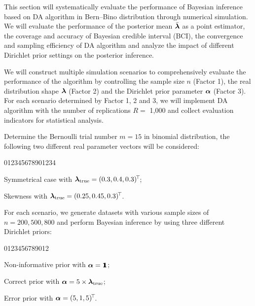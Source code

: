 This section will systematically evaluate the performance of Bayesian inference based on DA algorithm in Bern--Bino distribution through numerical simulation. We will evaluate the performance of the posterior mean $\bar{{\boldsymbol{\lambda}}}$ as a point estimator, the coverage and accuracy of Bayesian credible interval (BCI), the convergence and sampling efficiency of DA algorithm and analyze the impact of different Dirichlet prior settings on the posterior inference.

We will construct multiple simulation scenarios to comprehensively evaluate the performance of the algorithm by controlling the sample size $n$ (Factor 1), the real distribution shape ${\boldsymbol{\lambda}}$ (Factor 2) and the Dirichlet prior parameter ${\boldsymbol{\alpha}}$ (Factor 3). For each scenario determined by Factor 1, 2 and 3, we will implement DA algorithm with the number of replications $R=$ 1,000 and collect evaluation indicators for statistical analysis.

Determine the Bernoulli trial number $m=15$ in binomial distribution, the following two different real parameter vectors will be considered:
\begin{namelist}{012345678901234}
\item[\hspace*{-0.05cm} Scenario 1 ($\mbox{S}_1$):] Symmetrical case with ${\boldsymbol{\lambda}}_\text{true} = (0.3, 0.4, 0.3)^{\!\top\!}$;

\item[\hspace*{-0.05cm} Scenario 2 ($\mbox{S}_2$):] Skewness with ${\boldsymbol{\lambda}}_\text{true} = (0.25, 0.45, 0.3)^{\!\top\!}$.
\end{namelist}
For each scenario, we generate datasets with various sample sizes of $n=200,500,800$ and perform Bayesian inference by using three different Dirichlet priors:
\begin{namelist}{0123456789012}
\item[\hspace*{-0.05cm} Prior 1 ($\mbox{P}_1$):] Non-informative prior with ${\boldsymbol{\alpha}} = {\bf 1}\!\!\!{\bf 1}$;

\item[\hspace*{-0.05cm} Prior 2 ($\mbox{P}_2$):] Correct prior with ${\boldsymbol{\alpha}} = 5 \times {\boldsymbol{\lambda}}_\text{true}$;

\item[\hspace*{-0.05cm} Prior 3 ($\mbox{P}_3$):] Error prior with ${\boldsymbol{\alpha}} = (5, 1, 5)^{\!\top\!}$.
\end{namelist}

